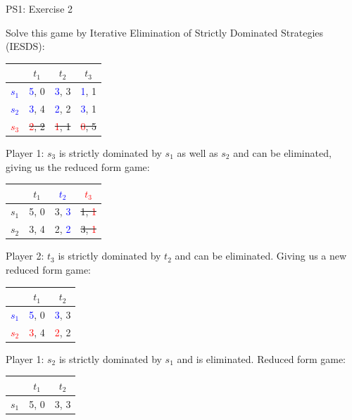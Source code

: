\begin{frame}{PS1: Exercise 2}
\begin{multicols}{2}
Solve this game by Iterative Elimination of Strictly Dominated Strategies (IESDS):
\begin{table}
  \begin{tabular}{c|c|c|c}
          & $t_1$ & $t_2$ & $t_3$ \\
    \midrule
    \textcolor{blue}{$s_1$} & \textcolor{blue}{5}, 0  & \textcolor{blue}{3}, 3  & \textcolor{blue}{1}, 1 \\
    \midrule
    \textcolor{blue}{$s_2$} & \textcolor{blue}{3}, 4  & \textcolor{blue}{2}, 2  & \textcolor{blue}{3}, 1 \\
    \midrule
    \sout{\textcolor{red}{$s_3$}} & \sout{\textcolor{red}{2}, 2}  & \sout{\textcolor{red}{1}, 1}  & \sout{\textcolor{red}{0}, 5}
  \end{tabular}
\end{table}
Player 1: $s_3$ is strictly dominated by $s_1$ as well as $s_2$ and can be eliminated, giving us the reduced form game:
\begin{table}
  \begin{tabular}{c|c|c|c}
          & $t_1$ & \textcolor{blue}{$t_2$} & \sout{\textcolor{red}{$t_3$}} \\
    \midrule
    $s_1$ & 5, 0  & 3, \textcolor{blue}{3}  & \sout{1, \textcolor{red}{1}} \\
    \midrule
    $s_2$ & 3, 4  & 2, \textcolor{blue}{2}  & \sout{3, \textcolor{red}{1}}
  \end{tabular}
\end{table}
Player 2: $t_3$ is strictly dominated by $t_2$ and can be eliminated.
\vfill\null \columnbreak
Giving us a new reduced form game:
\begin{table}
  \begin{tabular}{c|c|c}
          & $t_1$ & $t_2$ \\
    \midrule
    \textcolor{blue}{$s_1$} & \textcolor{blue}{5}, 0  & \textcolor{blue}{3}, 3  \\
    \midrule
    \textcolor{red}{$s_2$} & \textcolor{red}{3}, 4  & \textcolor{red}{2}, 2
  \end{tabular}
\end{table}
Player 1: $s_2$ is strictly dominated by $s_1$ and is eliminated. Reduced form game:
\begin{table}
  \begin{tabular}{c|c|c}
          & $t_1$ & $t_2$ \\
    \midrule
    $s_1$ & 5, 0  & 3, 3
  \end{tabular}
\end{table}
\vfill\null
\end{multicols}
\end{frame}

